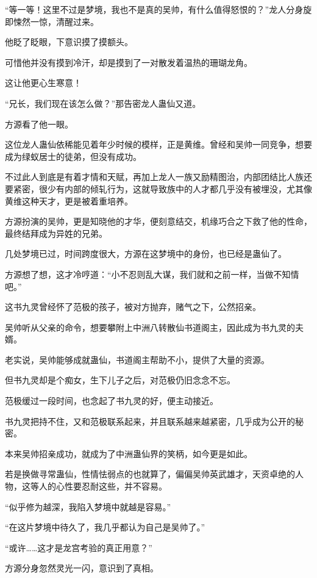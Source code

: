 
\begin{this_body}

“等一等！这里不过是梦境，我也不是真的吴帅，有什么值得怒恨的？”龙人分身旋即悚然一惊，清醒过来。

他眨了眨眼，下意识摸了摸额头。

可惜他并没有摸到冷汗，却是摸到了一对散发着温热的珊瑚龙角。

这让他更心生寒意！

“兄长，我们现在该怎么做？”那告密龙人蛊仙又道。

方源看了他一眼。

这位龙人蛊仙依稀能见着年少时候的模样，正是黄维。曾经和吴帅一同竞争，想要成为绿蚁居士的徒弟，但没有成功。

不过此人到底是有着才情和天赋，再加上龙人一族又励精图治，内部团结比人族还要紧密，很少有内部的倾轧行为，这就导致族中的人才都几乎没有被埋没，尤其像黄维这种天才，更是被着重培养。

方源扮演的吴帅，更是知晓他的才华，便刻意结交，机缘巧合之下救了他的性命，最终结拜成为异姓的兄弟。

几处梦境已过，时间跨度很大，方源在这梦境中的身份，也已经是蛊仙了。

方源想了想，这才冷哼道：“小不忍则乱大谋，我们就和之前一样，当做不知情吧。”

这书九灵曾经怀了范极的孩子，被对方抛弃，赌气之下，公然招亲。

吴帅听从父亲的命令，想要攀附上中洲八转散仙书道阁主，因此成为书九灵的夫婿。

老实说，吴帅能够成就蛊仙，书道阁主帮助不小，提供了大量的资源。

但书九灵却是个痴女，生下儿子之后，对范极仍旧念念不忘。

范极缓过一段时间，也念起了书九灵的好，便主动接近。

书九灵把持不住，又和范极联系起来，并且联系越来越紧密，几乎成为公开的秘密。

本来吴帅招亲成功，就成为了中洲蛊仙界的笑柄，如今更是如此。

若是换做寻常蛊仙，性情怯弱点的也就算了，偏偏吴帅英武雄才，天资卓绝的人物，这等人的心性要忍耐这些，并不容易。

“似乎修为越深，我陷入梦境中就越是容易。”

“在这片梦境中待久了，我几乎都认为自己是吴帅了。”

“或许……这才是龙宫考验的真正用意？”

方源分身忽然灵光一闪，意识到了真相。


\end{this_body}
